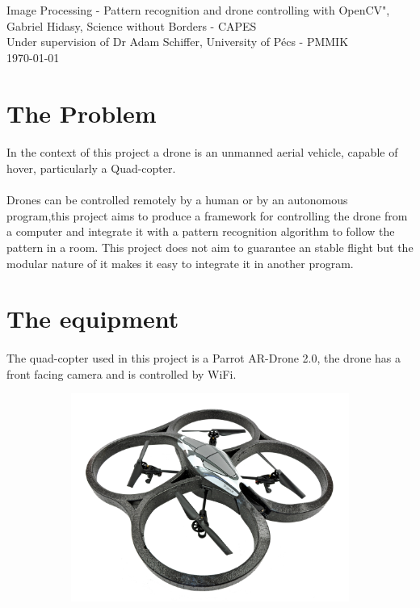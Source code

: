 \documentclass[11pt,twoside,a4paper]{article}
\begin{document}
\begin{center}
Image Processing - Pattern recognition and drone controlling with OpenCV",
Gabriel Hidasy, Science without Borders - CAPES\\
Under supervision of Dr Adam Schiffer, University of Pécs - PMMIK\\
\today
\end{center}

\section{The Problem}
\paragraph {} In the context of this project a drone is an unmanned aerial
vehicle, capable of hover, particularly a Quad-copter.
\paragraph {} Drones can be controlled remotely by a human or by an autonomous
program,this project aims to produce a framework for controlling the drone from
a computer and integrate it with a pattern recognition algorithm to follow the
pattern in a room. This project does not aim to guarantee an stable flight
but the modular nature of it makes it easy to integrate it in another program.

\section{The equipment}
\paragraph {} The quad-copter used in this project is a Parrot AR-Drone 2.0, the
drone has a front facing camera and is controlled by WiFi.
\begin{figure}[hbtp]
  \centering
\begin{subfigure}{.99\textwidth}
  \centering
  \includegraphics[width=.8\linewidth]{drone.jpg}
\end{subfigure}
\end{figure}
\end{document}

